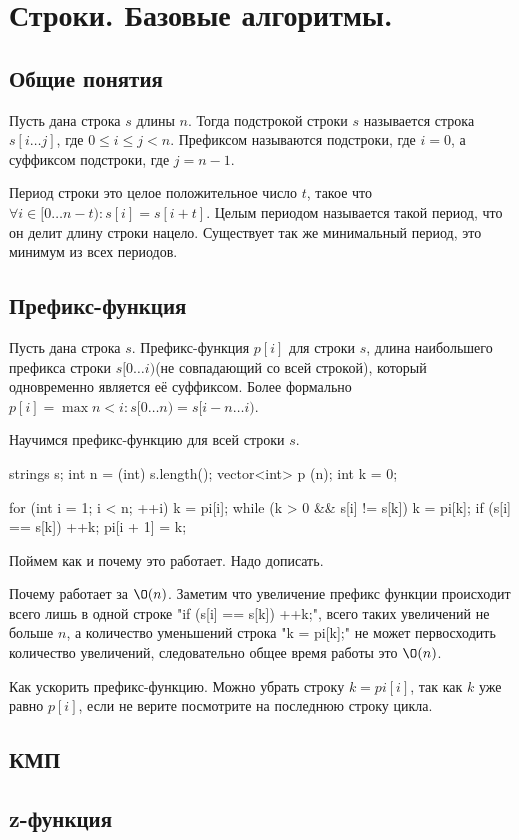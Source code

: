 \section{Строки. Базовые алгоритмы.}

\subsection{Общие понятия}

Пусть дана строка $s$ длины $n$. 
Тогда подстрокой строки $s$ называется строка $s[i \dots j]$, где $0 \le i \le j < n$.
Префиксом называются подстроки, где $i = 0$, а суффиксом подстроки, где $j = n - 1$.

Период строки это целое положительное число $t$, такое что $\forall i \in [0 \dots n-t) \colon s[i] = s[i + t]$.
Целым периодом называется такой период, что он делит длину строки нацело. 
Существует так же минимальный период, это минимум из всех периодов.

\subsection{Префикс-функция}
Пусть дана строка $s$. 
Префикс-функция $p[i]$ для строки $s$, длина наибольшего префикса строки $s[0 \dots i)$(не совпадающий со всей строкой), который одновременно является её суффиксом.
Более формально $p[i] = \max n < i \colon s[0 \dots n) = s[i - n \dots i)$.

Научимся префикс-функцию для всей строки $s$.

\begin{cppcode}
strings s;
int n = (int) s.length();
vector<int> p (n);
int k = 0;

for (int i = 1; i < n; ++i) {
  k = pi[i];
  while (k > 0 && s[i] != s[k])
    k = pi[k];
  if (s[i] == s[k]) ++k;
  pi[i + 1] = k;
}
\end{cppcode}

Поймем как и почему это работает. 
Надо дописать.

Почему работает за $\O(n)$.
Заметим что увеличение префикс функции происходит всего лишь в одной строке \cpp"if (s[i] == s[k]) ++k;", всего таких увеличений не больше $n$, а количество уменьшений строка \cpp"k = pi[k];" не может первосходить количество увеличений, следовательно общее время работы это $\O(n)$.

Как ускорить префикс-функцию.
Можно убрать строку $k = pi[i]$, так как $k$ уже равно $p[i]$, если не верите посмотрите на последнюю строку цикла.

\subsection{КМП}
\subsection{z-функция}